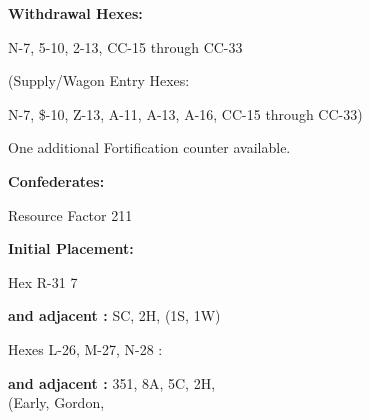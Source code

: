 \begin{scenariodata}
\textbf{Withdrawal Hexes:}\\
\end{scenariodata}

\begin{scenariodata}
N-7, 5-10, 2-13, CC-15 through CC-33\\
\end{scenariodata}

\begin{scenariodata}
(Supply/Wagon Entry Hexes:\\
\end{scenariodata}

\begin{scenariodata}
N-7, \$-10, Z-13, A-11, A-13, A-16, CC-15 through CC-33)\\
\end{scenariodata}

\begin{scenariodata}
One additional Fortification counter available.\\
\end{scenariodata}

\begin{scenariodata}
\textbf{Confederates:}\\
\end{scenariodata}

\begin{scenariodata}
Resource Factor 211\\
\end{scenariodata}

\begin{scenariodata}
\textbf{Initial Placement:}\\
\end{scenariodata}

\begin{scenariodata}
Hex R-31 7\\
\end{scenariodata}

\begin{scenariodata}
\textbf{and adjacent :} SC, 2H, (1S, 1W)\\
\end{scenariodata}

\begin{scenariodata}
Hexes L-26, M-27, N-28 :\\
\end{scenariodata}

\begin{scenariodata}
\textbf{and adjacent :} 351, 8A, 5C, 2H,\\
(Early, Gordon,\\
\end{scenariodata}

